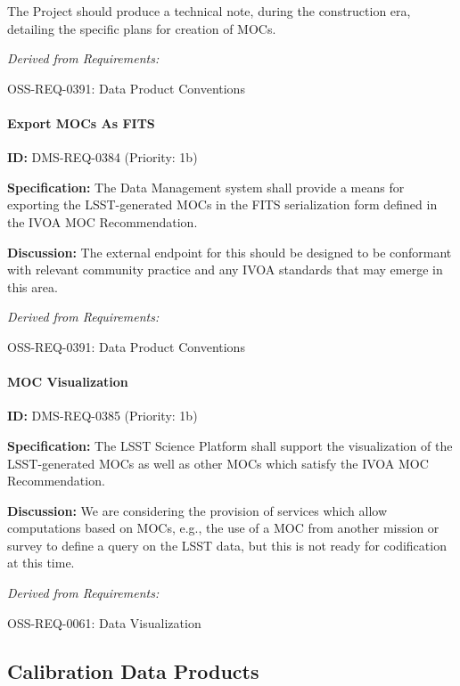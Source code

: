 \documentclass[SE,toc,lsstdraft]{lsstdoc}
\begin{document}
The Project should produce a technical note, during the construction era, detailing the specific plans for creation of MOCs.

\emph{Derived from Requirements:}

OSS-REQ-0391:
Data Product Conventions \newline

\paragraph{Export MOCs As FITS}\hfill  %

\label{DMS-REQ-0384}
\textbf{ID:} DMS-REQ-0384 (Priority: 1b)

\textbf{Specification:}
The Data Management system shall provide a means for exporting the LSST-generated MOCs in the FITS serialization form defined in the IVOA MOC Recommendation.

\textbf{Discussion:}
The external endpoint for this should be designed to be conformant with relevant community practice and any IVOA standards that may emerge in this area.

\emph{Derived from Requirements:}

OSS-REQ-0391:
Data Product Conventions \newline

\paragraph{MOC Visualization}\hfill  %

\label{DMS-REQ-0385}
\textbf{ID:} DMS-REQ-0385 (Priority: 1b)

\textbf{Specification:}
The LSST Science Platform shall support the visualization of the LSST-generated MOCs as well as other MOCs which satisfy the IVOA MOC Recommendation.

\textbf{Discussion:}
We are considering the provision of services which allow computations based on MOCs, e.g., the use of a MOC from another mission or survey to define a query on the LSST data, but this is not ready for codification at this time.

\emph{Derived from Requirements:}

OSS-REQ-0061:
Data Visualization \newline

\subsection{Calibration Data Products}
\end{document}
